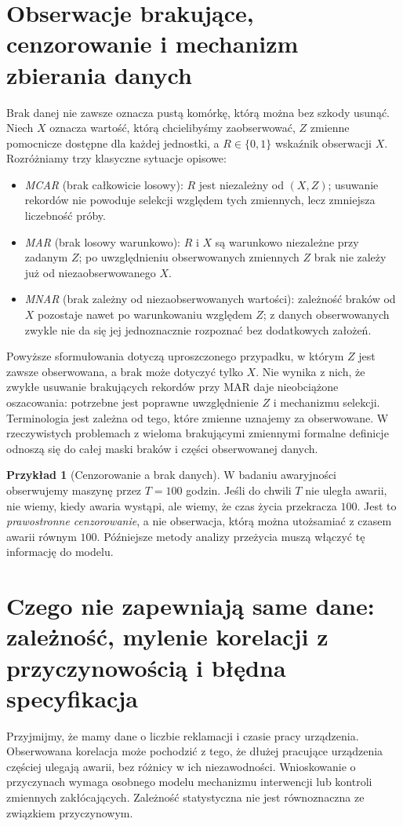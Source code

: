 \documentclass[11pt,a4paper,oneside]{report}
\numberwithin{equation}{chapter}
\theoremstyle{plain}
\theoremstyle{definition}
\newtheorem{przyklad}{Przykład}[chapter]
\theoremstyle{remark}
\begin{document}
\section{Obserwacje brakujące, cenzorowanie i mechanizm zbierania danych}
Brak danej nie zawsze oznacza pustą komórkę, którą można bez szkody usunąć. Niech $X$ oznacza wartość, którą chcielibyśmy zaobserwować, $Z$ zmienne pomocnicze dostępne dla każdej jednostki, a $R\in\{0,1\}$ wskaźnik obserwacji $X$. Rozróżniamy trzy klasyczne sytuacje opisowe:
\begin{itemize}
\item \emph{MCAR} (brak całkowicie losowy): $R$ jest niezależny od $(X,Z)$; usuwanie rekordów nie powoduje selekcji względem tych zmiennych, lecz zmniejsza liczebność próby.
\item \emph{MAR} (brak losowy warunkowo): $R$ i $X$ są warunkowo niezależne przy zadanym $Z$; po uwzględnieniu obserwowanych zmiennych $Z$ brak nie zależy już od niezaobserwowanego $X$.
\item \emph{MNAR} (brak zależny od niezaobserwowanych wartości): zależność braków od $X$ pozostaje nawet po warunkowaniu względem $Z$; z danych obserwowanych zwykle nie da się jej jednoznacznie rozpoznać bez dodatkowych założeń.
\end{itemize}
Powyższe sformułowania dotyczą uproszczonego przypadku, w którym $Z$ jest zawsze obserwowana, a brak może dotyczyć tylko $X$. Nie wynika z nich, że zwykłe usuwanie brakujących rekordów przy MAR daje nieobciążone oszacowania: potrzebne jest poprawne uwzględnienie $Z$ i mechanizmu selekcji. Terminologia jest zależna od tego, które zmienne uznajemy za obserwowane. W rzeczywistych problemach z wieloma brakującymi zmiennymi formalne definicje odnoszą się do całej maski braków i części obserwowanej danych.

\begin{przyklad}[Cenzorowanie a brak danych]
W badaniu awaryjności obserwujemy maszynę przez $T=100$ godzin. Jeśli do chwili $T$ nie uległa awarii, nie wiemy, kiedy awaria wystąpi, ale wiemy, że czas życia przekracza $100$. Jest to \emph{prawostronne cenzorowanie}, a nie obserwacja, którą można utożsamiać z czasem awarii równym $100$. Późniejsze metody analizy przeżycia muszą włączyć tę informację do modelu.
\end{przyklad}

\section{Czego nie zapewniają same dane: zależność, mylenie korelacji z przyczynowością i błędna specyfikacja}
Przyjmijmy, że mamy dane o liczbie reklamacji i czasie pracy urządzenia. Obserwowana korelacja może pochodzić z tego, że dłużej pracujące urządzenia częściej ulegają awarii, bez różnicy w ich niezawodności. Wnioskowanie o przyczynach wymaga osobnego modelu mechanizmu interwencji lub kontroli zmiennych zakłócających. Zależność statystyczna nie jest równoznaczna ze związkiem przyczynowym.
\end{document}
